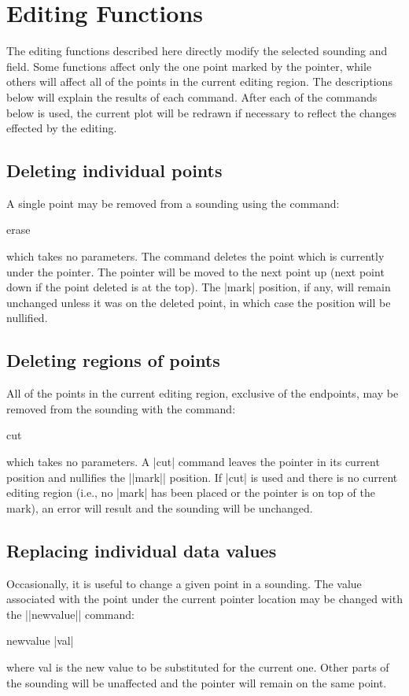 \section{Editing Functions}
The editing functions described here directly modify the selected sounding and
field.  Some functions affect only the one point marked by the pointer, while
others will affect all of the points in the current editing region.  The
descriptions below will explain the results of each command.  After each of 
the commands below is used, the current plot will be redrawn if necessary to 
reflect the changes effected by the editing.

\subsection{Deleting individual points}
A single point may be removed from a sounding using the command:
\begin{example}
	erase
\end{example}
which takes no parameters.  The command deletes the point which is currently 
under the pointer.  The pointer will be moved to the next point up (next point
down if the point deleted is at the top).  The |mark| position, if any, will
remain unchanged unless it was on the deleted point, in which case the 
position will be nullified.

\subsection{Deleting regions of points}
All of the points in the current editing region, exclusive of the endpoints,
may be removed from the sounding with the command:
\begin{example}
	cut
\end{example}
which takes no parameters.  A |cut| command leaves the pointer in its current
position and nullifies the ||mark|| position.  If |cut| is used and there
is no current editing region (i.e., no |mark| has been placed or the pointer
is on top of the mark), an error will result and the sounding will be
unchanged.

\subsection{Replacing individual data values}
Occasionally, it is useful to change a given point in a sounding.  The 
value associated with the point under the current pointer location may be
changed with the ||newvalue|| command:
\begin{example}
	newvalue |val|
\end{example}
where {\pf val} is the new value to be substituted for the current one.  
Other parts of the sounding will be unaffected and the pointer will remain 
on the same point.

